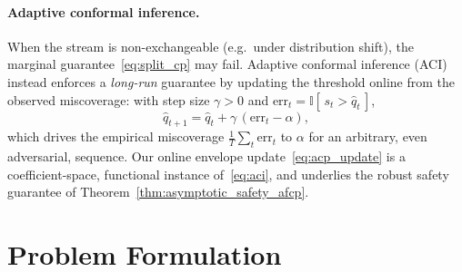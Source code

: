 \documentclass[lettersize,journal]{IEEEtran}
\begin{document}
\paragraph{Adaptive conformal inference.}
When the stream is non-exchangeable (e.g.\ under distribution shift), the marginal
guarantee~\eqref{eq:split_cp} may fail. Adaptive conformal inference
(ACI)~\cite{gibbs2021adaptiveconformalinferencedistribution} instead enforces a
\emph{long-run} guarantee by updating the threshold online from the observed
miscoverage: with step size $\gamma>0$ and
$\mathrm{err}_t=\mathbb{I}[\,s_t> \hat q_t\,]$,
\begin{equation}
\hat q_{t+1}=\hat q_t+\gamma\,(\mathrm{err}_t-\alpha),
\label{eq:aci}
\end{equation}
which drives the empirical miscoverage $\tfrac1T\sum_{t}\mathrm{err}_t$ to $\alpha$
for an arbitrary, even adversarial, sequence. Our online envelope
update~\eqref{eq:acp_update} is a coefficient-space, functional instance
of~\eqref{eq:aci}, and underlies the robust safety guarantee of
Theorem~\ref{thm:asymptotic_safety_afcp}.


\section{Problem Formulation}
\end{document}
